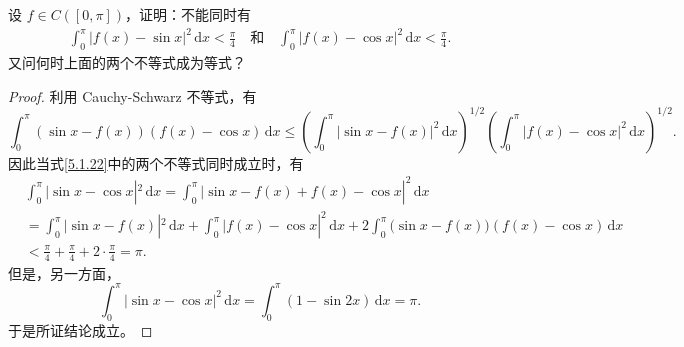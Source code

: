 \documentclass[../../main.tex]{subfiles}
\begin{document}
\begin{example}
设 \( f \in C([0,\pi]) \)，证明：不能同时有
\begin{align}
\int_{0}^{\pi} |f(x) - \sin x|^2 \, \mathrm{d}x < \frac{\pi}{4}
\quad \text{和} \quad
\int_{0}^{\pi} |f(x) - \cos x|^2 \, \mathrm{d}x < \frac{\pi}{4}. \label{5.1.22}
\end{align}
又问何时上面的两个不等式成为等式？
\end{example}
\begin{proof}
利用 Cauchy-Schwarz 不等式，有
\[
\int_{0}^{\pi} (\sin x - f(x))(f(x) - \cos x) \, \mathrm{d}x
\leqslant \left( \int_{0}^{\pi} |\sin x - f(x)|^2 \, \mathrm{d}x \right)^{1/2} \left( \int_{0}^{\pi} |f(x) - \cos x|^2 \, \mathrm{d}x \right)^{1/2}.
\]
因此当式\eqref{5.1.22}中的两个不等式同时成立时，有
\begin{align*}
&\int_0^{\pi}{|\sin x}-\cos x|^2\,\mathrm{d}x=\int_0^{\pi}{|\sin x}-f(x)+f(x)-\cos x|^2\,\mathrm{d}x
\\
&=\int_0^{\pi}{|\sin x}-f(x)|^2\,\mathrm{d}x+\int_0^{\pi}{|f(x)}-\cos x|^2\,\mathrm{d}x+2\int_0^{\pi}{(\sin x}-f(x))(f(x)-\cos x)\,\mathrm{d}x
\\
&<\frac{\pi}{4}+\frac{\pi}{4}+2\cdot \frac{\pi}{4}=\pi .
\end{align*}
但是，另一方面，
\[
\int_{0}^{\pi} |\sin x - \cos x|^2 \, \mathrm{d}x = \int_{0}^{\pi} (1 - \sin 2x) \, \mathrm{d}x = \pi.
\]
于是所证结论成立。


\end{proof}
\end{document}
